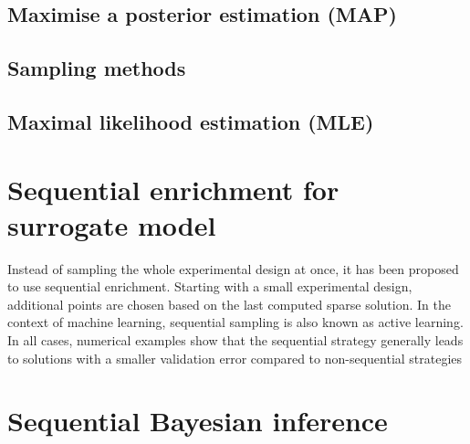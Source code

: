 \subsection{Maximise a posterior estimation (MAP)}


\subsection{Sampling methods}

\subsection{Maximal likelihood estimation (MLE)}




\section{Sequential enrichment for surrogate model}

Instead of sampling the whole experimental design at once, it has been proposed to use sequential enrichment. Starting with
a small experimental design, additional points are chosen based on the last computed sparse
solution. In the context of machine learning, sequential sampling is also known as active learning.  In all
cases, numerical examples show that the sequential strategy generally leads to solutions with
a smaller validation error compared to non-sequential strategies



\section{Sequential Bayesian inference}




